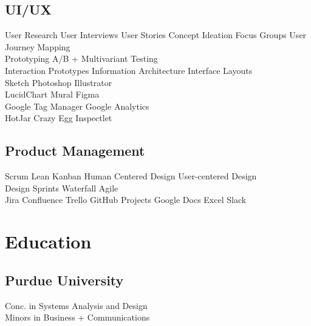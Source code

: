 \documentclass[]{deedy-resume-openfont}
\begin{document}
\begin{minipage}[t]{0.33\textwidth}
\subsection{UI/UX}
User Research \textbullet{} User Interviews \textbullet{} User Stories \textbullet{} Concept Ideation \textbullet{} Focus Groups \textbullet{} User Journey Mapping \\
Prototyping \textbullet{} A/B + Multivariant Testing  \\
\vspace{1pt}
Interaction Prototypes \textbullet{} Information Architecture \textbullet{} Interface Layouts \\
\vspace{1pt}
Sketch \textbullet{} Photoshop \textbullet{} Illustrator \\
LucidChart \textbullet{} Mural \textbullet{} Figma \\
Google Tag Manager \textbullet{} Google Analytics \\
HotJar \textbullet{} Crazy Egg \textbullet{} Inspectlet \\
\vspace{5pt}
\subsection{Product Management}
Scrum \textbullet{} Lean \textbullet{} Kanban \textbullet{} Human Centered Design \textbullet{} User-centered Design \\
Design Sprints \textbullet{} Waterfall \textbullet{} Agile \\
\vspace{1pt}
Jira \textbullet{} Confluence \textbullet{} Trello \textbullet{} GitHub Projects \textbullet{} Google Docs \textbullet{} Excel \textbullet{} Slack \\
\sectionsep


\section{Education}

\subsection{Purdue University}
Conc. in Systems Analysis and Design \\
Minors in Business + Communications \\
\location
\sectionsep



\end{minipage}
\end{document}
